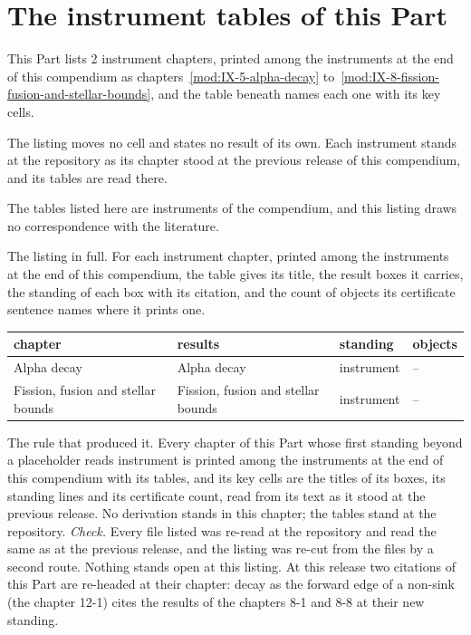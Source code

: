 \section{The instrument tables of this Part}\label{mod:XII-L-the-instrument-tables-at-the-repository}
\begin{chtable}\label{box:XII-L-the-instrument-tables-at-the-repository:1}
This Part lists 2 instrument chapters, printed among the instruments at the end of this compendium as chapters~\ref{mod:IX-5-alpha-decay} to~\ref{mod:IX-8-fission-fusion-and-stellar-bounds}, and the table beneath names each one with its key cells.
\end{chtable}
The listing moves no cell and states no result of its own. Each instrument stands at the repository as its chapter stood at the previous release of this compendium, and its tables are read there.
\begin{chbridge}
The tables listed here are instruments of the compendium, and this listing draws no correspondence with the literature.
\end{chbridge}
\begin{chproof}[instrument]
The listing in full. For each instrument chapter, printed among the instruments at the end of this compendium, the table gives its title, the result boxes it carries, the standing of each box with its citation, and the count of objects its certificate sentence names where it prints one.
{\small
\begin{longtable}{p{38mm}p{63mm}p{30mm}p{14mm}}
\hline
chapter & results & standing & objects \\
\hline
\endhead
Alpha decay & Alpha decay & instrument & -- \\
Fission, fusion and stellar bounds & Fission, fusion and stellar bounds & instrument & -- \\
\hline
\end{longtable}
}
The rule that produced it. Every chapter of this Part whose first standing beyond a placeholder reads instrument is printed among the instruments at the end of this compendium with its tables, and its key cells are the titles of its boxes, its standing lines and its certificate count, read from its text as it stood at the previous release.
No derivation stands in this chapter; the tables stand at the repository.
\emph{Check.} Every file listed was re-read at the repository and read the same as at the previous release, and the listing was re-cut from the files by a second route.
Nothing stands open at this listing. At this release two citations of this Part are re-headed at their chapter: decay as the forward edge of a non-sink (the chapter 12-1) cites the results of the chapters 8-1 and 8-8 at their new standing.
\end{chproof}
\label{chend:XII-L-the-instrument-tables-at-the-repository}
